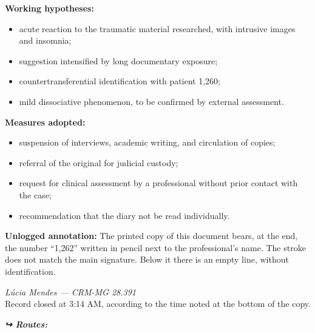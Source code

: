 \noindent \textbf{Working hypotheses:}

\begin{itemize}
\item acute reaction to the traumatic material researched, with intrusive images and insomnia;
\item suggestion intensified by long documentary exposure;
\item countertransferential identification with patient 1,260;
\item mild dissociative phenomenon, to be confirmed by external assessment.
\end{itemize}

\noindent \textbf{Measures adopted:}

\begin{itemize}
\item suspension of interviews, academic writing, and circulation of copies;
\item referral of the original for judicial custody;
\item request for clinical assessment by a professional without prior contact with the case;
\item recommendation that the diary not be read individually.
\end{itemize}

\noindent \textbf{Unlogged annotation:}
\noindent The printed copy of this document bears, at the end, the number ``1,262'' written in pencil next to the professional's name. The stroke does not match the main signature. Below it there is an empty line, without identification.

\noindent \textit{Lúcia Mendes --- CRM-MG 28.391}\\
\noindent Record closed at 3:14 AM, according to the time noted at the bottom of the copy.




\vspace{0.5em}
\noindent\textit{\textbf{↪ Routes:}  \rotasep {} \rotasep {}}